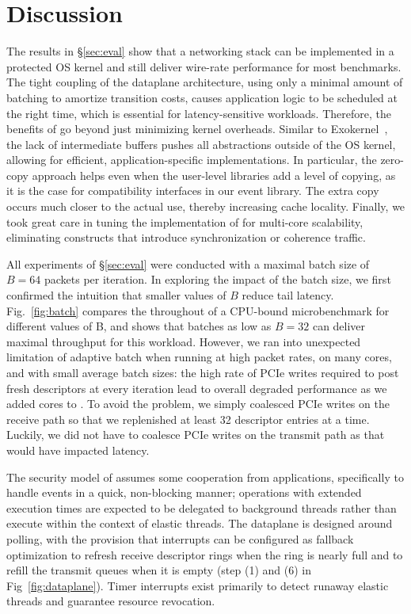 
\section{Discussion}
\label{sec:disc}


 The results in \S\ref{sec:eval}
show that a networking stack can be implemented in a protected OS
kernel and still deliver wire-rate performance for most benchmarks.
The tight coupling of the dataplane architecture, using only a minimal
amount of batching to amortize transition costs, causes application
logic to be scheduled at the right time, which is essential for
latency-sensitive workloads.  Therefore, the benefits of \ix go beyond
just minimizing kernel overheads. Similar to
Exokernel~\cite{DBLP:conf/sosp/EnglerKO95}, the lack of intermediate
buffers pushes all abstractions outside of the OS kernel, allowing for
efficient, application-specific implementations.  In particular, the
zero-copy approach helps even when the user-level libraries add a
level of copying, as it is the case for compatibility interfaces in
our event library.  The extra copy occurs much closer to the actual
use, thereby increasing cache locality.  Finally, we took great care
in tuning the implementation of \ix for multi-core scalability,
eliminating constructs that introduce synchronization or coherence
traffic.

 All experiments of
\S\ref{sec:eval} were conducted with a maximal batch size of $B=64$
packets per iteration. In exploring the impact of the batch size, we
first confirmed the intuition that smaller values of $B$ reduce tail
latency.  Fig.~\ref{fig:batch} compares the throughout of a CPU-bound
microbenchmark for different values of B, and shows that batches as
low as $B=32$ can deliver maximal throughput for this workload.
However, we ran into unexpected limitation of adaptive batch when
running \ix at high packet rates, on many cores, and with small
average batch sizes: the high rate of PCIe writes required to post
fresh descriptors at every iteration lead to overall degraded
performance as we added cores to \ix.  To avoid the problem, we simply
coalesced PCIe writes on the receive path so that we replenished at
least 32 descriptor entries at a time.  Luckily, we did not have to
coalesce PCIe writes on the transmit path as that would have impacted latency.


The security model of \ix assumes some cooperation from applications,
specifically to handle events in a quick, non-blocking manner;
operations with extended execution times are expected to be delegated
to background threads rather than execute within the context of
elastic threads.  The \ix dataplane is designed around polling, with
the provision that interrupts can be configured as fallback
optimization to refresh receive descriptor rings when the ring is
nearly full and to refill the transmit queues when it is empty (step
(1) and (6) in Fig~\ref{fig:dataplane}).  Timer interrupts exist
primarily to detect runaway elastic threads and guarantee resource
revocation.


